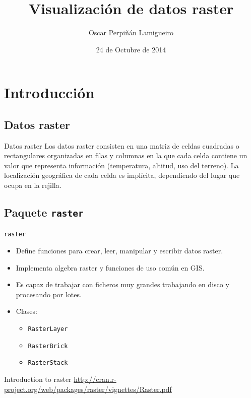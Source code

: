 \documentclass[xcolor={usenames,svgnames,dvipsnames}]{beamer}
\author{Oscar Perpiñán Lamigueiro}
\date{24 de Octubre de 2014}
\title{Visualización de datos raster}
\begin{document}
\maketitle

\section{Introducción}
\label{sec-1}

\subsection{Datos raster}
\label{sec-1-1}
\begin{frame}[label=sec-1-1-1]{}
\begin{block}{Datos raster}
Los datos raster consisten en una matriz de celdas cuadradas o
rectangulares organizadas en filas y columnas en la que cada celda
contiene un valor que representa información (temperatura, altitud,
uso del terreno). La localización geográfica de cada celda es
implícita, dependiendo del lugar que ocupa en la rejilla.
\end{block}
\end{frame}

\subsection{Paquete \texttt{raster}}
\label{sec-1-2}
\begin{frame}[fragile,label=sec-1-2-1]{\texttt{raster}}
 \begin{itemize}
\item Define funciones para crear, leer, manipular y escribir datos raster.
\item Implementa algebra raster y funciones de uso común en GIS.
\item Es capaz de trabajar con ficheros muy grandes trabajando en disco y procesando por lotes.
\item Clases:
\begin{itemize}
\item \texttt{RasterLayer}
\item \texttt{RasterBrick}
\item \texttt{RasterStack}
\end{itemize}
\end{itemize}

\begin{block}{Introduction to raster}
\url{http://cran.r-project.org/web/packages/raster/vignettes/Raster.pdf}
\end{block}
\end{frame}
\end{document}
